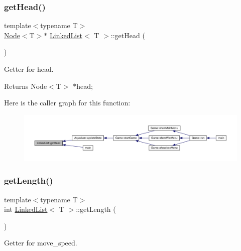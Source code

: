 \subsubsection{\texorpdfstring{get\+Head()}{getHead()}}
{\footnotesize\ttfamily template$<$typename T$>$ \\
\mbox{\hyperlink{class_node}{Node}}$<$T$>$$\ast$ \mbox{\hyperlink{class_linked_list}{Linked\+List}}$<$ T $>$\+::get\+Head (\begin{DoxyParamCaption}{ }\end{DoxyParamCaption})\hspace{0.3cm}{\ttfamily [inline]}}



Getter for head. 

\begin{DoxyReturn}{Returns}
Node$<$\+T$>$ $\ast$head; 
\end{DoxyReturn}
Here is the caller graph for this function\+:
\nopagebreak
\begin{figure}[H]
\begin{center}
\leavevmode
\includegraphics[width=350pt]{class_linked_list_aa4614ce35a543b74afb3c5bff8b018d4_icgraph}
\end{center}
\end{figure}
\mbox{\label{class_linked_list_ac650bde26cf5b3c074e2d59f97e0ff3b}} 
\subsubsection{\texorpdfstring{get\+Length()}{getLength()}}
{\footnotesize\ttfamily template$<$typename T$>$ \\
int \mbox{\hyperlink{class_linked_list}{Linked\+List}}$<$ T $>$\+::get\+Length (\begin{DoxyParamCaption}{ }\end{DoxyParamCaption})\hspace{0.3cm}{\ttfamily [inline]}}



Getter for move\+\_\+speed. 

